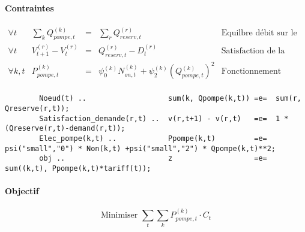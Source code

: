 \documentclass{article}
\begin{document}
\paragraph{Contraintes}
$$
\left.
    \begin{array}{lcccc}
        \forall t   &   \sum_k Q_{pompe,t}^{(k)}    & = &   \sum_r Q_{reserv,t}^{(r)}  &   \text{Equilbre débit sur le réseau}\\[0.2cm]
        \forall t   &   V_{t+1}^{(r)}-V_t^{(r)}     & = &   Q_{reserv,t}^{(r)} - D_t^{(r)} & \text{Satisfaction de la demande (pas horaire)}\\[0.2cm]
        \forall k,t &   P_{pompe,t}^{(k)}           & = &   \psi_0^{(k)}N_{on,t}^{(k)}  + \psi_2^{(k)}(Q_{pompe,t}^{(k)})^2 &   \text{Fonctionnement pompe}\\[0.2cm]
    \end{array}
\right.
$$
\begin{adjustbox}{max width=\textwidth}
    \begin{lstlisting}
        Noeud(t) ..                   sum(k, Qpompe(k,t)) =e=  sum(r, Qreserve(r,t));
        Satisfaction_demande(r,t) ..  v(r,t+1) - v(r,t)   =e=  1 * (Qreserve(r,t)-demand(r,t));
        Elec_pompe(k,t) ..            Ppompe(k,t)         =e=  psi("small","0") * Non(k,t) +psi("small","2") * Qpompe(k,t)**2;
        obj ..                        z                   =e=  sum((k,t), Ppompe(k,t)*tariff(t));
    \end{lstlisting}
\end{adjustbox}

\paragraph{Objectif}
$$
    \text{Minimiser }   \sum_t \sum_k P_{pompe,t}^{(k)}\cdot C_t
$$
\end{document}
